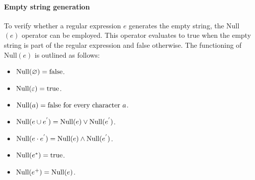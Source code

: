 \paragraph*{Empty string generation}
To verify whether a regular expression $e$ generates the empty string, the Null$(e)$ operator can be employed. 
This operator evaluates to true when the empty string is part of the regular expression and false otherwise. 
The functioning of Null$(e)$ is outlined as follows:
\begin{itemize}
    \item $\textnormal{Null}(\varnothing)=\textnormal{false}$. 
    \item $\textnormal{Null}(\varepsilon)=\textnormal{true}$. 
    \item $\textnormal{Null}(a)=\textnormal{false for every character } a$.
    \item $\textnormal{Null}(e \cup e^{'})=\textnormal{Null}(e) \lor \textnormal{Null}(e^{'})$.
    \item $\textnormal{Null}(e \cdot e^{'})=\textnormal{Null}(e) \land \textnormal{Null}(e^{'})$.
    \item $\textnormal{Null}(e^{*})=\textnormal{true}$. 
    \item $\textnormal{Null}(e^{+})=\textnormal{Null}(e)$. 
\end{itemize}

